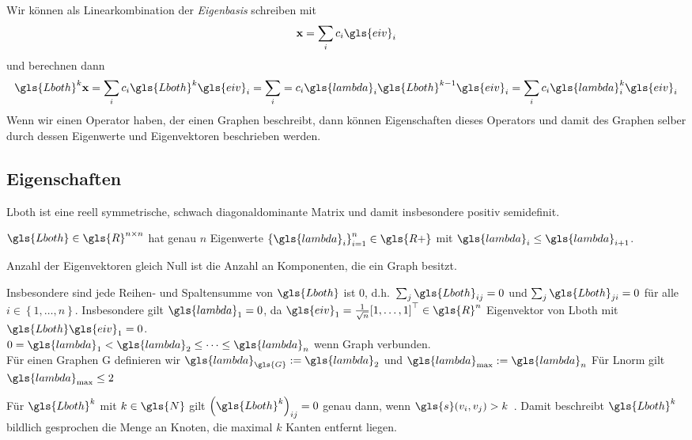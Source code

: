 Wir können  als Linearkombination der \emph{Eigenbasis} schreiben mit
\begin{equation}
  \ve{x} = \sum_i c_i \gls{eiv}_i
\end{equation}
und berechnen dann
\begin{equation}
  \gls{Lboth}^k \ve{x} = \sum_i c_i \gls{Lboth}^k \gls{eiv}_i = \sum_i = c_i \gls{lambda}_i \gls{Lboth}^{k-1} \gls{eiv}_i = \sum_i c_i \gls{lambda}_i^k \gls{eiv}_i
\end{equation}
Wenn wir einen Operator haben, der einen Graphen beschreibt, dann können Eigenschaften dieses Operators und damit des Graphen selber durch dessen Eigenwerte und Eigenvektoren beschrieben werden.

\subsection{Eigenschaften}

\gls{Lboth} ist eine reell symmetrische, schwach diagonaldominante Matrix und damit insbesondere positiv semidefinit.

$\gls{Lboth} \in \gls{R}^{n \times n}$ hat genau $n$ Eigenwerte ${\left\{\gls{lambda}_i\right\}}_{i = 1}^n \in \gls{R+}$ mit $\gls{lambda}_i \leq \gls{lambda}_{i+1}$.

Anzahl der Eigenvektoren gleich Null ist die Anzahl an Komponenten, die ein Graph besitzt.

Insbesondere sind jede Reihen- und Spaltensumme von $\gls{Lboth}$ ist $0$, d.h.\ $\sum_j \gls{Lboth}_{ij} = 0$ und $\sum_j \gls{Lboth}_{ji} = 0$ für alle $i \in \left\{1, \ldots, n\right\}$.
Insbesondere gilt $\gls{lambda}_1 = 0$, da $\gls{eiv}_1 = \frac{1}{\sqrt{n}}{\left[1, \ldots, 1\right]}^{\top} \in \gls{R}^n$ Eigenvektor von \gls{Lboth} mit $\gls{Lboth}\gls{eiv}_1 = 0$.\\

$0 = \gls{lambda}_1 < \gls{lambda}_2 \leq \cdots \leq \gls{lambda}_n$ wenn Graph verbunden.\\

Für einen Graphen \gls{G} definieren wir $\gls{lambda}_{\gls{G}} := \gls{lambda}_2$ und $\gls{lambda}_{\max} := \gls{lambda}_n$
Für \gls{Lnorm} gilt $\gls{lambda}_{\max} \leq 2$

Für $\gls{Lboth}^{k}$ mit $k \in \gls{N}$ gilt ${\left(\gls{Lboth}^k\right)}_{ij} = 0$ genau dann, wenn $\gls{s}\left(v_i, v_j\right) > k$~\cite{Hammond}.
Damit beschreibt $\gls{Lboth}^k$ bildlich gesprochen die Menge an Knoten, die maximal $k$ Kanten entfernt liegen.

